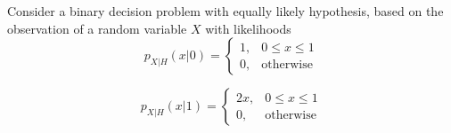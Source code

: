 \begin{solution}
\end{solution}

\else

\question Consider a binary decision problem with equally likely hypothesis, based on the observation of a random variable $X$ with likelihoods
\[
p_{X|H}(x|0) = \left \{
  \begin{array}{cc}
    1, & 0 \le x \le 1\\
0, & \mbox{otherwise}
  \end{array}
\right.
\]

\[
p_{X|H}(x|1) = \left \{
  \begin{array}{cc}
    2x, & 0 \le x \le 1\\
0, & \mbox{otherwise}
  \end{array}
\right.
\]


